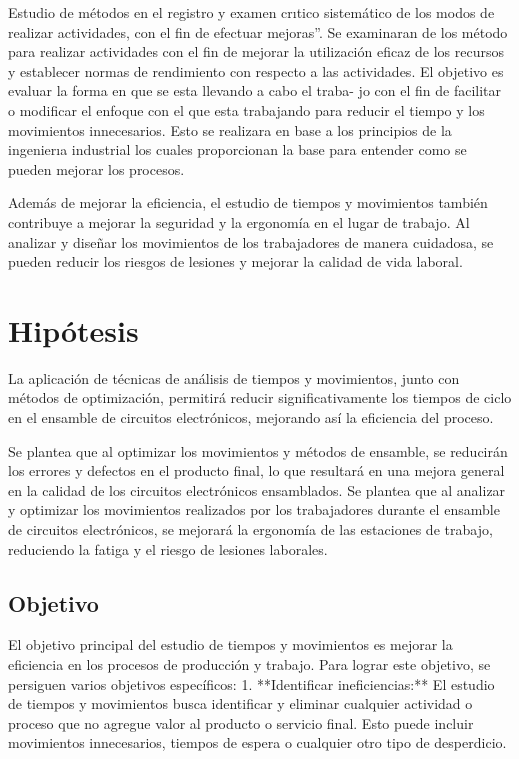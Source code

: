      Estudio de métodos en el registro y examen crıtico
     sistemático de los modos de realizar actividades, con el
     fin de efectuar mejoras”. Se examinaran de los método para realizar actividades con el fin de mejorar la utilización eficaz de los recursos y establecer normas de rendimiento con respecto a las actividades. El objetivo es
     evaluar la forma en que se esta llevando a cabo el traba-
     jo con el fin de facilitar o modificar el enfoque con el que
     esta trabajando para reducir el tiempo y los movimientos
     innecesarios. Esto se realizara en base a los principios de
     la ingenierıa industrial los cuales proporcionan la base
     para entender como se pueden mejorar los procesos.
     
     Además de mejorar la eficiencia, el estudio de tiempos y movimientos también contribuye a mejorar la seguridad y la ergonomía en el lugar de trabajo. Al analizar y diseñar los movimientos de los trabajadores de manera cuidadosa, se pueden reducir los riesgos de lesiones y mejorar la calidad de vida laboral. \cite{niebel1980ingenieria}
     
     
     
     \section{Hipótesis}
     
     La aplicación de técnicas de análisis de tiempos y movimientos, junto con métodos de optimización, permitirá reducir significativamente los tiempos de ciclo en el ensamble de circuitos electrónicos, mejorando así la eficiencia del proceso.
     
     Se plantea que al optimizar los movimientos y métodos de ensamble, se reducirán los errores y defectos en el producto final, lo que resultará en una mejora general en la calidad de los circuitos electrónicos ensamblados.
     Se plantea que al analizar y optimizar los movimientos realizados por los trabajadores durante el ensamble de circuitos electrónicos, se mejorará la ergonomía de las estaciones de trabajo, reduciendo la fatiga y el riesgo de lesiones laborales.
     
     \subsection{Objetivo}
     
     El objetivo principal del estudio de tiempos y movimientos es mejorar la eficiencia en los procesos de producción y trabajo. Para lograr este objetivo, se persiguen varios objetivos específicos: 1. **Identificar ineficiencias:** El estudio de tiempos y movimientos busca identificar y eliminar cualquier actividad o proceso que no agregue valor al producto o servicio final. Esto puede incluir movimientos innecesarios, tiempos de espera o cualquier otro tipo de desperdicio.
     
